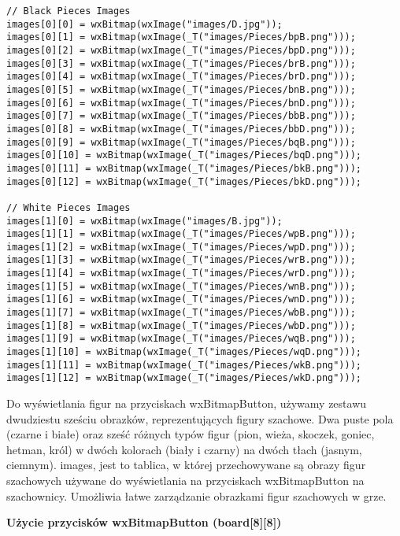 \documentclass[]{report}
\begin{document}
\begin{lstlisting}
// Black Pieces Images
images[0][0] = wxBitmap(wxImage("images/D.jpg"));
images[0][1] = wxBitmap(wxImage(_T("images/Pieces/bpB.png")));
images[0][2] = wxBitmap(wxImage(_T("images/Pieces/bpD.png")));
images[0][3] = wxBitmap(wxImage(_T("images/Pieces/brB.png")));
images[0][4] = wxBitmap(wxImage(_T("images/Pieces/brD.png")));
images[0][5] = wxBitmap(wxImage(_T("images/Pieces/bnB.png")));
images[0][6] = wxBitmap(wxImage(_T("images/Pieces/bnD.png")));
images[0][7] = wxBitmap(wxImage(_T("images/Pieces/bbB.png")));
images[0][8] = wxBitmap(wxImage(_T("images/Pieces/bbD.png")));
images[0][9] = wxBitmap(wxImage(_T("images/Pieces/bqB.png")));
images[0][10] = wxBitmap(wxImage(_T("images/Pieces/bqD.png")));
images[0][11] = wxBitmap(wxImage(_T("images/Pieces/bkB.png")));
images[0][12] = wxBitmap(wxImage(_T("images/Pieces/bkD.png")));

// White Pieces Images
images[1][0] = wxBitmap(wxImage("images/B.jpg"));
images[1][1] = wxBitmap(wxImage(_T("images/Pieces/wpB.png")));
images[1][2] = wxBitmap(wxImage(_T("images/Pieces/wpD.png")));
images[1][3] = wxBitmap(wxImage(_T("images/Pieces/wrB.png")));
images[1][4] = wxBitmap(wxImage(_T("images/Pieces/wrD.png")));
images[1][5] = wxBitmap(wxImage(_T("images/Pieces/wnB.png")));
images[1][6] = wxBitmap(wxImage(_T("images/Pieces/wnD.png")));
images[1][7] = wxBitmap(wxImage(_T("images/Pieces/wbB.png")));
images[1][8] = wxBitmap(wxImage(_T("images/Pieces/wbD.png")));
images[1][9] = wxBitmap(wxImage(_T("images/Pieces/wqB.png")));
images[1][10] = wxBitmap(wxImage(_T("images/Pieces/wqD.png")));
images[1][11] = wxBitmap(wxImage(_T("images/Pieces/wkB.png")));
images[1][12] = wxBitmap(wxImage(_T("images/Pieces/wkD.png")));
\end{lstlisting}
\vspace{\baselineskip}
Do wyświetlania figur na przyciskach wxBitmapButton, używamy zestawu dwudziestu sześciu obrazków, reprezentujących figury szachowe. Dwa puste pola (czarne i białe) oraz sześć różnych typów figur (pion, wieża, skoczek, goniec, hetman, król) w dwóch kolorach (biały i czarny) na dwóch tłach (jasnym, ciemnym). images, jest to tablica, w której przechowywane są obrazy figur szachowych używane do wyświetlania na przyciskach wxBitmapButton na szachownicy. Umożliwia łatwe zarządzanie obrazkami figur szachowych w grze.
\newpage
\begin{flushleft}
\textbf{Użycie przycisków wxBitmapButton (board[8][8])}
\end{flushleft}
\end{document}
